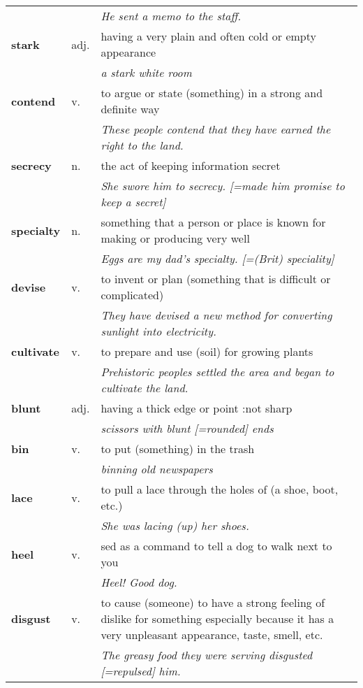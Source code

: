 \documentclass[a4paper]{article}
\begin{document}
\begin{longtable}{llp{11cm}}
 & & \textit{He sent a memo to the staff.}\\[0.08cm]
\textbf{stark} & adj. &  having a very plain and often cold or empty appearance \\
 & & \textit{a stark white room}\\[0.08cm]
\textbf{contend} & v. &  to argue or state (something) in a strong and definite way \\
 & & \textit{These people contend that they have earned the right to the land.}\\[0.08cm]
\textbf{secrecy} & n. &  the act of keeping information secret \\
 & & \textit{She swore him to secrecy. [=made him promise to keep a secret]}\\[0.08cm]
\textbf{specialty} & n. &  something that a person or place is known for making or producing very well \\
 & & \textit{Eggs are my dad's specialty. [=(Brit) speciality]}\\[0.08cm]
\textbf{devise} & v. &  to invent or plan (something that is difficult or complicated) \\
 & & \textit{They have devised a new method for converting sunlight into electricity.}\\[0.08cm]
\textbf{cultivate} & v. &  to prepare and use (soil) for growing plants \\
 & & \textit{Prehistoric peoples settled the area and began to cultivate the land.}\\[0.08cm]
\textbf{blunt} & adj. &  having a thick edge or point :not sharp \\
 & & \textit{scissors with blunt [=rounded] ends}\\[0.08cm]
\textbf{bin} & v. &  to put (something) in the trash \\
 & & \textit{binning old newspapers}\\[0.08cm]
\textbf{lace} & v. &  to pull a lace through the holes of (a shoe, boot, etc.) \\
 & & \textit{She was lacing (up) her shoes.}\\[0.08cm]
\textbf{heel} & v. &  sed as a command to tell a dog to walk next to you \\
 & & \textit{Heel! Good dog.}\\[0.08cm]
\textbf{disgust} & v. &  to cause (someone) to have a strong feeling of dislike for something especially because it has a very unpleasant appearance, taste, smell, etc. \\
 & & \textit{The greasy food they were serving disgusted [=repulsed] him.}\\[0.08cm]

\end{longtable}
\end{document}
